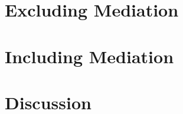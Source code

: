 \section{Excluding Mediation}
\label{sec:results:no_mediation}

\section{Including Mediation}
\label{sec:results:mediation}

\section{Discussion}
\label{sec:results:discussion}
